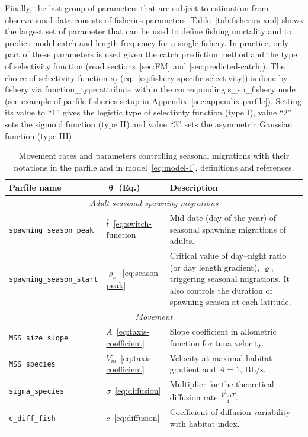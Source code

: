 Finally, the last group of parameters that are subject to estimation from observational data consists of fisheries parameters. Table~\ref{tab:fisheries-xml} shows the largest set of parameter that can be used to define fishing mortality and to predict model catch and length frequency for a single fishery. In practice, only part of these parameters is used given the catch prediction method and the type of selectivity function (read sections~\ref{sec:FM} and \ref{sec:predicted-catch}). The choice of selectivity function $s_f$ (eq.~\ref{eq:fishery-specific-selectivity}) is done by fishery via {\ttfamily function\_type} attribute within the corresponding {\ttfamily s\_sp\_fishery} node (see example of parfile fisheries setup in Appendix~\ref{sec:appendix-parfile}). Setting its value to ``1'' gives the logistic type of selectivity function (type I), value ``2'' sets the sigmoid function (type II) and value ``3'' sets the asymmetric Gaussian function (type III).  

\begin{table}[H]
\caption{Movement rates and parameters controlling seasonal migrations with their notations in the parfile and in model~\ref{eq:model-1}, definitions and  references.}
  \begin{tabular}{p{4.5cm}p{1.75cm}p{9cm}}\hline
    \textbf{Parfile name}	& $\boldsymbol \uptheta$ (\textbf{Eq.})&  \textbf{Description}\\\hline 
    \multicolumn{3}{c}{\textit{ Adult seasonal spawning migrations}} \\
    \hline 
    \texttt{spawning\_season\_peak}& $\hat{t}$~\eqref{eq:switch-function}  & Mid-date (day of the year) of seasonal spawning migrations of adults. \\
    \texttt{spawning\_season\_start} & $\varrho_s$~\eqref{eq:season-peak} & Critical value of day--night ratio (or day length gradient), $\varrho$, triggering seasonal migrations. It also controls the duration of spawning season at each latitude.\\    
    \hline
  \multicolumn{3}{c}{\textit{ Movement}} \\
    \hline
    \texttt{MSS\_size\_slope} & $A$~\eqref{eq:taxis-coefficient} & {Slope coefficient in allometric function for tuna velocity.}\\    
    \texttt{MSS\_species}  & $V_m$~\eqref{eq:taxis-coefficient}& {Velocity at maximal habitat gradient and $A=1$, $\text{BL}/\text{s}$.} \\
    \texttt{sigma\_species}& $\sigma$~\eqref{eq:diffusion} & {Multiplier for the theoretical diffusion rate $\frac{{\bar{V}}^2 \Delta T}{4}$.} \\    
    \texttt{c\_diff\_fish}& $c$~\eqref{eq:diffusion}  & Coefficient of diffusion variability with habitat index.\\
    \hline    
\end{tabular}
\label{tab:movement-xml}
\end{table} 

